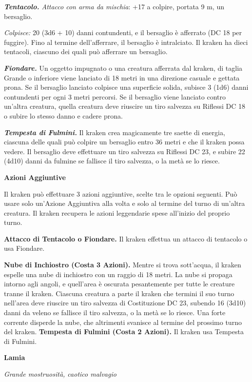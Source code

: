 \begin{multicols}{2}
\emph{\textbf{Tentacolo.} Attacco con arma da mischia}: +17 a colpire,
portata 9 m, un bersaglio.

\emph{Colpisce:} 20 (3d6 + 10) danni contundenti, e il bersaglio è
afferrato (DC 18 per fuggire). Fino al termine dell'afferrare, il
bersaglio è intralciato. Il kraken ha dieci tentacoli, ciascuno dei
quali può afferrare un bersaglio.

\emph{\textbf{Fiondare.}} Un oggetto impugnato o una creatura afferrata
dal kraken, di taglia Grande o inferiore viene lanciato di 18 metri in
una direzione casuale e gettata prona. Se il bersaglio lanciato colpisce
una superficie solida, subisce 3 (1d6) danni contundenti per ogni 3
metri percorsi. Se il bersaglio viene lanciato contro un'altra creatura,
quella creatura deve riuscire un tiro salvezza su Riflessi DC 18 o
subire lo stesso danno e cadere prona.

\emph{\textbf{Tempesta di Fulmini.}} Il kraken crea magicamente tre
saette di energia, ciascuna delle quali può colpire un bersaglio entro
36 metri e che il kraken possa vedere. Il bersaglio deve effettuare un
tiro salvezza su Riflessi DC 23, e subire 22 (4d10) danni da fulmine se
fallisce il tiro salvezza, o la metà se lo riesce.

\textbf{Azioni Aggiuntive}

Il kraken può effettuare 3 azioni aggiuntive, scelte tra le opzioni
seguenti. Può usare solo un'Azione Aggiuntiva alla volta e solo al
termine del turno di un'altra creatura. Il kraken recupera le azioni
leggendarie spese all'inizio del proprio turno.

\textbf{Attacco di Tentacolo o Fiondare.} Il kraken effettua un attacco
di tentacolo o usa Fiondare.

\textbf{Nube di Inchiostro (Costa 3 Azioni).} Mentre si trova
sott'acqua, il kraken espelle una nube di inchiostro con un raggio di 18
metri. La nube si propaga intorno agli angoli, e quell'area è oscurata
pesantemente per tutte le creature tranne il kraken. Ciascuna creatura a
parte il kraken che termini il suo turno nell'area deve riuscire un tiro
salvezza di Costituzione DC 23, subendo 16 (3d10) danni da veleno se
fallisce il tiro salvezza, o la metà se lo riesce. Una forte corrente
disperde la nube, che altrimenti svanisce al termine del prossimo turno
del kraken. \textbf{Tempesta di Fulmini (Costa 2 Azioni).} Il kraken usa
Tempesta di Fulmini.



\textbf{Lamia}

\emph{Grande mostruosità, caotico malvagio}


\end{multicols}
